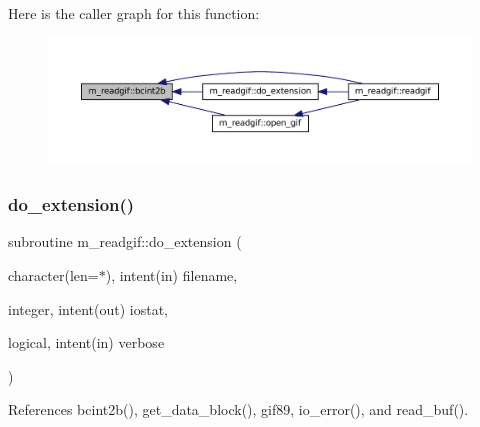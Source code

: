 Here is the caller graph for this function\+:
\nopagebreak
\begin{figure}[H]
\begin{center}
\leavevmode
\includegraphics[width=350pt]{namespacem__readgif_a38594ce718f97f844771250edcd5e496_icgraph}
\end{center}
\end{figure}
\mbox{\label{namespacem__readgif_a93c5f69ee5054ba2c10ed17b8ab53f6b}} 
\subsubsection{\texorpdfstring{do\+\_\+extension()}{do\_extension()}}
{\footnotesize\ttfamily subroutine m\+\_\+readgif\+::do\+\_\+extension (\begin{DoxyParamCaption}\item[{character(len=$\ast$), intent(in)}]{filename,  }\item[{integer, intent(out)}]{iostat,  }\item[{logical, intent(in)}]{verbose }\end{DoxyParamCaption})\hspace{0.3cm}{\ttfamily [private]}}



References bcint2b(), get\+\_\+data\+\_\+block(), gif89, io\+\_\+error(), and read\+\_\+buf().

